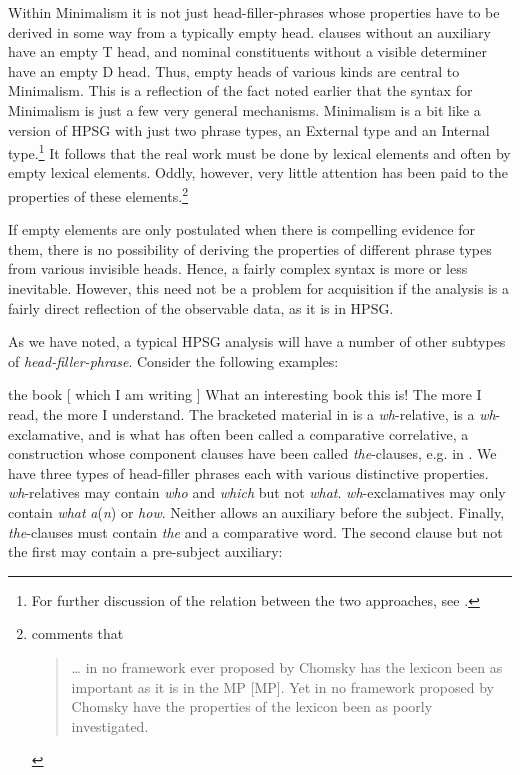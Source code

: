 \documentclass[output=paper]{langsci/langscibook}
\begin{document}
Within Minimalism it is not just head-filler-phrases whose properties have to
be derived in some way from a typically empty head.  clauses without an
auxiliary have an empty T head, and  nominal constituents without a
visible determiner have an empty D head. Thus, empty heads of various kinds are
central to Minimalism. This is a reflection of the fact noted earlier that the
syntax for Minimalism is just a few very general mechanisms. Minimalism is a
bit like a version of \gls{HPSG} with just two phrase types, an External 
type and an Internal  type.\footnote{For further discussion of the
relation between the two approaches, see \citet{Muller2013}.} It follows that
the real work must be done by lexical elements and often by empty lexical
elements. Oddly, however, very little attention has been paid to the properties
of these elements.\footnote{\textcite[95, fn.\ 9]{Newmeyer2005} comments that
    \blockquote{\dots{} in no framework ever proposed by Chomsky has the
lexicon been as important as it is in the \gls{MP} [\glsdesc{MP}].
Yet in no framework proposed by Chomsky have the properties of the lexicon been
as poorly investigated.}}

If empty elements are only postulated when there is compelling evidence for
them, there is no possibility of deriving the properties of different phrase
types from various invisible heads. Hence, a fairly complex syntax is more or
less inevitable. However, this need not be a problem for acquisition if the
analysis is a fairly direct reflection of the observable data, as it is in
\gls{HPSG}.

As we have noted, a typical \gls{HPSG} analysis will have a number of other
subtypes of \emph{head-filler-phrase}. Consider the following examples:

\ea\label{ex:borsley:4.9}
    the book [ which I am writing ]
\ex\label{ex:borsley:4.10}
    What an interesting book this is!
\ex\label{ex:borsley:4.11}
    The more I read, the more I understand.
\z
%
The bracketed material in  is a \emph{wh}-relative,
 is a \emph{wh}-exclamative, and  is what has
often been called a comparative correlative, a construction whose component
clauses have been called \emph{the}{}-clauses, e.g. in \citet{Borsley2011}. We
have three types of head-filler phrases each with various distinctive
properties. \emph{wh}-relatives may contain \emph{who} and \emph{which} but not
\emph{what}. \emph{wh}-exclamatives may only contain \emph{what}
\emph{a}(\emph{n}) or \emph{how}. Neither allows an auxiliary before the
subject. Finally, \emph{the}{}-clauses must contain \emph{the} and a
comparative word. The second clause but not the first may contain a pre-subject
auxiliary:
\end{document}
